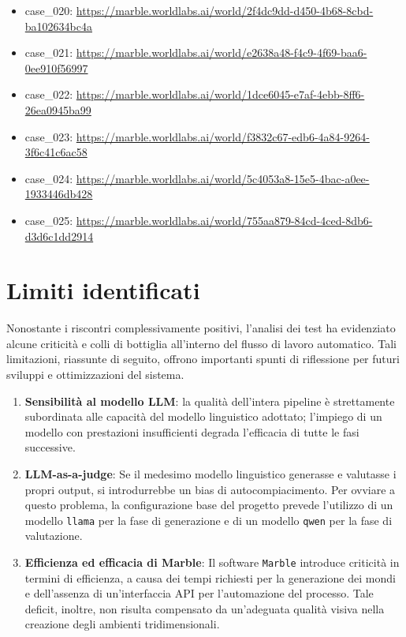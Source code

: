 \documentclass[11pt]{report}
\begin{document}
\begin{itemize}
    \item case\_020: \url{https://marble.worldlabs.ai/world/2f4dc9dd-d450-4b68-8cbd-ba102634bc4a}
    \item case\_021: \url{https://marble.worldlabs.ai/world/e2638a48-f4c9-4f69-baa6-0ee910f56997}
    \item case\_022: \url{https://marble.worldlabs.ai/world/1dce6045-e7af-4ebb-8ff6-26ea0945ba99}
    \item case\_023: \url{https://marble.worldlabs.ai/world/f3832c67-edb6-4a84-9264-3f6c41c6ac58}
    \item case\_024: \url{https://marble.worldlabs.ai/world/5c4053a8-15e5-4bac-a0ee-1933446db428}
    \item case\_025: \url{https://marble.worldlabs.ai/world/755aa879-84cd-4ced-8db6-d3d6c1dd2914}
\end{itemize}

\section{Limiti identificati}
Nonostante i riscontri complessivamente positivi, l'analisi dei test ha evidenziato alcune criticità e colli di bottiglia all'interno del flusso di lavoro automatico. Tali limitazioni, riassunte di seguito, offrono importanti spunti di riflessione per futuri sviluppi e ottimizzazioni del sistema.
 
\begin{enumerate}
    \item \textbf{Sensibilità al modello LLM}: la qualità dell'intera pipeline è strettamente subordinata alle capacità del modello linguistico adottato; l'impiego di un modello con prestazioni insufficienti degrada l'efficacia di tutte le fasi successive.
    \item \textbf{LLM-as-a-judge}: Se il medesimo modello linguistico generasse e valutasse i propri output, si introdurrebbe un bias di autocompiacimento. Per ovviare a questo problema, la configurazione base del progetto prevede l'utilizzo di un modello \texttt{llama} per la fase di generazione e di un modello \texttt{qwen} per la fase di valutazione.
    \item \textbf{Efficienza ed efficacia di Marble}: Il software \texttt{Marble} introduce criticità in termini di efficienza, a causa dei tempi richiesti per la generazione dei mondi e dell'assenza di un'interfaccia API per l'automazione del processo. Tale deficit, inoltre, non risulta compensato da un'adeguata qualità visiva nella creazione degli ambienti tridimensionali.
\end{enumerate}
 
\end{document}
